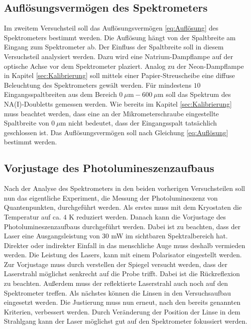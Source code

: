 \subsection{Auflösungsvermögen des Spektrometers}
Im zweitem Versuchsteil soll das Auflösungsvermögen \eqref{eq:Auflösung} des Spektrometers bestimmt werden. 
Die Auflösung hängt von der Spaltbreite am Eingang zum Spektrometer ab. Der Einfluss der Spaltbreite soll in diesem Versuchsteil analysiert werden. 
Dazu wird eine Natrium-Dampflampe auf der optische Achse vor dem Spektrometer plaziert. 
Analog zu der Neon-Dampflampe in Kapitel \ref{sec:Kalibrierung} soll mittels einer Papier-Streuscheibe eine diffuse Beleuchtung des Spektrometers gewält werden. 
Für mindestens $10$ Eingangsspaltbreiten aus dem Bereich $0\ \mu\mathrm{m} - 600\ \mu\mathrm{m}$ soll das Spektrum des NA(I)-Doubletts gemessen werden. 
Wie bereits im Kapitel \ref{sec:Kalibrierung} muss beachtet werden, dass eine an der Mikrometerschraube eingestellte Spaltbreite von $0\ \mu$m nicht bedeutet, dass der Eingangsspalt tatsächlich geschlossen ist.
Das Auflösungsvermögen soll nach Gleichung \eqref{eq:Auflösung} bestimmt werden.

\subsection{Vorjustage des Photolumineszenzaufbaus}
\label{sec:Justage}
Nach der Analyse des Spektrometers in den beiden vorherigen Versuchsteilen soll nun das eigentliche Experiment, die Messung der Photolumineszenz von Quantenpunkten, durchgeführt werden. 
Als erstes muss mit dem Kryostaten die Temperatur auf ca. $4$ K reduziert werden. 
Danach kann die Vorjustage des Photolumineszenzaufbaus durchgeführt werden. 
Dabei ist zu beachten, dass der Laser eine Ausgangsleistung von $30$ mW im sichtbaren Spektralbereich hat. 
Direkter oder indirekter Einfall in das menschliche Auge muss deshalb vermieden werden. 
Die Leistung des Lasers, kann mit einem Polarisator eingestellt werden. 
Zur Vorjustage muss durch verstellen der Spiegel versucht werden, dass der Laserstrahl möglichst senkrecht auf die Probe trifft. 
Dabei ist die Rückreflexion zu beachten.
Außerdem muss der reflektierte Laserstrahl auch noch auf den Spektrometer treffen. 
Als nächstes können die Linsen in den Versuchsaufbau eingesetzt werden. 
Die Justierung muss nun erneut, nach den bereits genannten Kriterien, verbessert werden. 
Durch Veränderung der Position der Linse in dem Strahlgang kann der Laser möglichst gut auf den Spektrometer fokussiert werden. 
